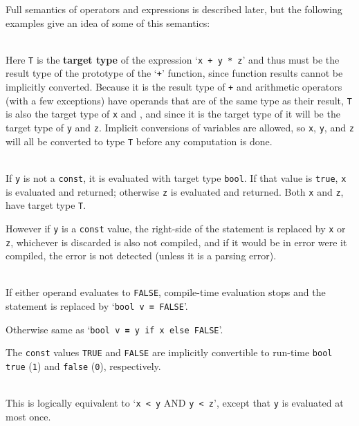 \documentclass[12pt]{article}
\newcommand{\TT}[1]{{\tt \bfseries #1}}
\newcommand{\key}[1]{{\rm \bfseries #1}}
\newenvironment{indpar}[1][0.3in]%
	{\begin{list}{}%
		     {\setlength{\itemsep}{0in}%
		      \setlength{\topsep}{0in}%
		      \setlength{\parsep}{1ex}%
		      \setlength{\labelwidth}{#1}%
		      \setlength{\leftmargin}{#1}%
		      \addtolength{\leftmargin}{\labelsep}}%
	 \item}%
	{\end{list}}
\begin{document}
Full semantics of operators and expressions is described later,
but the following examples give an idea of some of this semantics:

\begin{indpar}
\hspace*{-0.2in}{\tt T v \TT{=} x + y * z} \\
       Here {\tt T} is the \key{target type} of the expression
       `{\tt x + y * z}' and thus must be the result type of the prototype
       of the `{\tt +}' function, since function results cannot be
       implicitly converted.  Because it is the result type of {\tt +} and
       arithmetic operators (with a few exceptions)
       have operands that are of the same
       type as their result,
       {\tt T} is also the target type of {\tt x} and {\tt *}, and since it is
       the target type of {\tt *} it will be the target type of {\tt y}
       and {\tt z}.  Implicit conversions of variables are allowed,
       so {\tt x}, {\tt y}, and {\tt z} will all be converted
       to type {\tt T} before any computation is done.

\hspace*{-0.2in}{\tt T v \TT{=} x \TT{if} y \TT{else} z} \\
      If {\tt y} is not a {\tt const}, it is evaluated with
      target type {\tt bool}.  If that value
      is {\tt true}, {\tt x} is evaluated and returned; otherwise
      {\tt z} is evaluated and returned.  Both {\tt x} and {\tt z},
      have target type {\tt T}.

      However if {\tt y} is a {\tt const} value, the right-side of
      the statement is replaced by {\tt x} or {\tt z}, whichever
      is discarded is also not compiled, and if it would be in error
      were it compiled, the error is not detected (unless it is a parsing
      error).

\hspace*{-0.2in}{\tt bool v = x \TT{AND} y} \\
      If either operand evaluates to {\tt FALSE},
      compile-time evaluation stops and the statement is replaced by
      `{\tt bool v \TT{=} FALSE}'.

      Otherwise same as `{\tt bool v \TT{=} y if x else FALSE}'.

      The {\tt const} values {\tt TRUE}
      and {\tt FALSE} are implicitly convertible to run-time {\tt bool}
      {\tt true} ({\tt 1}) and {\tt false} ({\tt 0}), respectively.
 
\hspace*{-0.2in}{\tt x \TT{<} y \TT{<} z} \\
      This is logically equivalent to `{\tt x < y} AND {\tt y < z}', except that
      {\tt y} is evaluated at most once.


\end{indpar}
\end{document}
